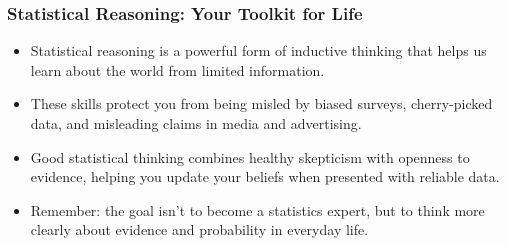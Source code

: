 \documentclass{beamer}
\begin{document}
				\begin{frame}
					\frametitle{Statistical Reasoning: Your Toolkit for Life}
					
					\begin{itemize}
						\item Statistical reasoning is a powerful form of inductive thinking that helps us learn about the world from limited information.
						\item These skills protect you from being misled by biased surveys, cherry-picked data, and misleading claims in media and advertising.
						\item Good statistical thinking combines healthy skepticism with openness to evidence, helping you update your beliefs when presented with reliable data.
						\item Remember: the goal isn't to become a statistics expert, but to think more clearly about evidence and probability in everyday life.
					\end{itemize}
					
					\begin{center}
					\end{center}
					
				\end{frame}
				
		
\end{document}
